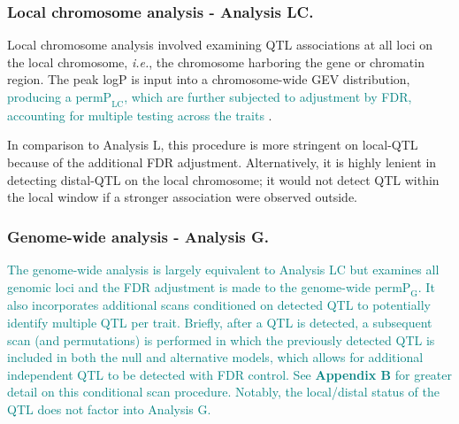 \documentclass[9pt,twocolumn,twoside]{gsajnl}
\newcommand{\ie}{\emph{i.e.}\xspace}
\newcommand{\permplc}{\text{permP}_{\text{LC}}}
\newcommand{\permpg}{\text{permP}_{\text{G}}}
\newcommand{\WV}[2]{\textcolor{red}{#1\footnote{\textcolor{red}{WV: #2}}}}
\newcommand{\GKinline}[1]{\textcolor{teal}{#1}}
\begin{document}

\subsubsection{Local chromosome analysis - Analysis LC.} 
Local chromosome analysis involved examining QTL associations at all loci on the local chromosome, \ie, the chromosome harboring the gene or chromatin region. The peak logP is input into a chromosome-wide GEV distribution, \GKinline{producing a $\permplc$, which are further subjected to adjustment by FDR, accounting for multiple testing across the traits \citep{Chesler2005}}. 

In comparison to Analysis L, this procedure is more stringent on local-QTL because of the additional FDR adjustment. Alternatively, it is highly lenient in detecting distal-QTL on the local chromosome; it would not detect QTL within the local window if a stronger association were observed outside.


\subsubsection{Genome-wide analysis - Analysis G.} 
\GKinline{The genome-wide analysis is largely equivalent to Analysis LC but examines all genomic loci and the FDR adjustment is made to the genome-wide $\permpg$. It also incorporates additional scans conditioned on detected QTL to potentially identify multiple QTL per trait. Briefly, after a QTL is detected, a subsequent scan (and permutations) is performed in which the previously detected QTL is included in both the null and alternative models, which allows for additional independent QTL to be detected with FDR control. See \textbf{Appendix B} for greater detail on this conditional scan procedure. Notably, the local/distal status of the QTL does not factor into Analysis G.}
\end{document}
